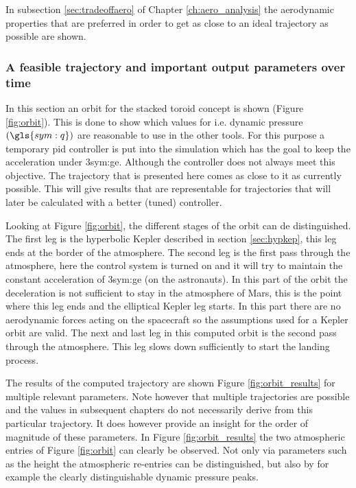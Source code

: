 In subsection \ref{sec:tradeoffaero} of Chapter \ref{ch:aero_analysis} the aerodynamic properties that are preferred in order to get as close to an ideal trajectory as possible are shown.

\subsubsection{A feasible trajectory and important output parameters over time}
\label{sec:astrorestraj}

In this section an orbit for the stacked toroid concept is shown (Figure \ref{fig:orbit}). This is done to show which values for i.e. dynamic pressure $\left(\gls{sym:q}\right)$ are reasonable to use in the other tools. For this purpose a temporary \gls{pid} controller is put into the simulation which has the goal to keep the acceleration under 3\gls{sym:ge}. Although the controller does not always meet this objective. The trajectory that is presented here comes as close to it as currently possible. This will give results that are representable for trajectories that will later be calculated with a better (tuned) controller.

Looking at Figure \ref{fig:orbit}, the different stages of the orbit can de distinguished. The first leg is the hyperbolic Kepler described in section \ref{sec:hypkep}, this leg ends at the border of the atmosphere. The second leg is the first pass through the atmosphere, here the control system is turned on and it will try to maintain the constant acceleration of 3\gls{sym:ge} (on the astronauts). In this part of the orbit the deceleration is not sufficient to stay in the atmosphere of Mars, this is the point where this leg ends and the elliptical Kepler leg starts. In this part there are no aerodynamic forces acting on the spacecraft so the assumptions used for a Kepler orbit are valid. The next and last leg in this computed orbit is the second pass through the atmosphere. This leg slows down sufficiently to start the landing process.

The results of the computed trajectory are shown Figure \ref{fig:orbit_results} for multiple relevant parameters. Note however that multiple trajectories are possible and the values in subsequent chapters do not necessarily derive from this particular trajectory. It does however provide an insight for the order of magnitude of these parameters. In Figure \ref{fig:orbit_results} the two atmospheric entries of Figure \ref{fig:orbit} can clearly be observed. Not only via parameters such as the height the atmospheric re-entries can be distinguished, but also by for example the clearly distinguishable dynamic pressure peaks.

